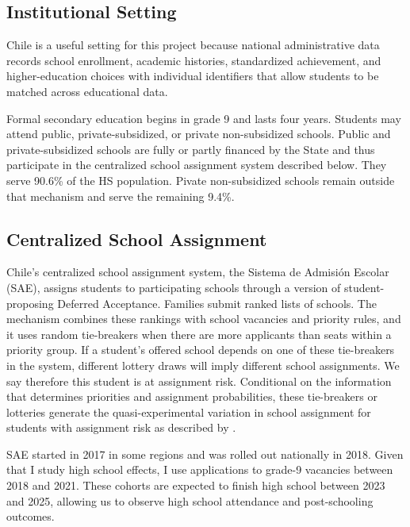 \documentclass[a4paper, article, english, oneside, unknownkeysallowed, 12pt]{memoir}
\begin{document}
\subsection{Institutional Setting}

Chile is a useful setting for this project because national administrative data records school enrollment, academic histories, standardized achievement, and higher-education choices with individual identifiers that allow students to be matched across educational data.

Formal secondary education begins in grade 9 and lasts four years.
Students may attend public, private-subsidized, or private non-subsidized schools.
Public and private-subsidized schools are fully or partly financed by the State and thus participate in the centralized school assignment system described below.
They serve 90.6\% of the HS population. Pivate non-subsidized schools remain outside that mechanism and serve the remaining 9.4\%.



\subsection{Centralized School Assignment}

Chile's centralized school assignment system, the Sistema de Admisi\'on Escolar (SAE), assigns students to participating schools through a version of student-proposing Deferred Acceptance.
Families submit ranked lists of schools.
The mechanism combines these rankings with school vacancies and priority rules, and it uses random tie-breakers when there are more applicants than seats within a priority group.
If a student's offered school depends on one of these tie-breakers in the system, different lottery draws will imply different school assignments.
We say therefore this student is at assignment risk.  Conditional on the information that determines priorities and assignment probabilities, these tie-breakers or lotteries generate the quasi-experimental variation in school assignment for students with assignment risk as described by \textcite{abdulkadiroglu_research_2017}.


SAE started in 2017 in some regions and was rolled out nationally in 2018. 
Given that I study high school effects, I use applications to grade-9 vacancies between 2018 and 2021. 
These cohorts are expected to finish high school between 2023 and 2025, allowing us to observe high school attendance and post-schooling outcomes.
\end{document}
